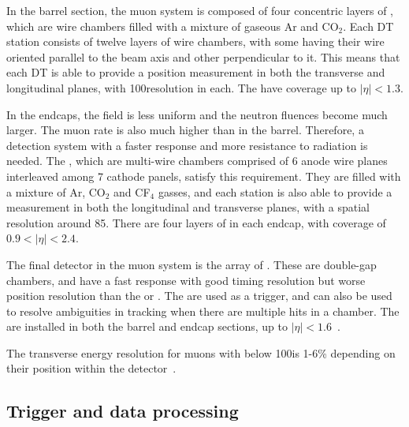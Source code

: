  In the barrel section, the muon system is composed of four concentric layers of \DTs, which are wire chambers filled with a mixture of gaseous Ar and CO$_{2}$. Each DT station consists of twelve layers of wire chambers, with some having their wire oriented parallel to the beam axis and other perpendicular to it. This means that each DT is able to provide a position measurement in both the transverse and longitudinal planes, with 100\um resolution in each. The \DTs have coverage up to $|\eta|<1.3$. 

In the endcaps, the field is less uniform and the neutron fluences become much larger. The muon rate is also much higher than in the barrel. Therefore, a detection system with a faster response and more resistance to radiation is needed. The \CSCs, which are multi-wire chambers comprised of 6 anode wire planes interleaved among 7 cathode panels, satisfy this requirement. They are filled with a mixture of Ar, CO$_{2}$ and CF$_{4}$ gasses, and each station is also able to provide a measurement in both the longitudinal and transverse planes, with a spatial resolution around 85\um. There are four layers of \CSCs in each endcap, with coverage of $0.9<|\eta|<2.4$.

The final detector in the muon system is the array of \RPCs. These are double-gap chambers, and have a fast response with good timing resolution but worse position resolution than the \DTs or \CSCs. The \RPCs are used as a trigger, and can also be used to resolve ambiguities in tracking when there are multiple hits in a chamber. The \RPCs are installed in both the barrel and endcap sections, up to $|\eta|<1.6$~\cite{CMSatLHC,cmsMuon}. 

The transverse energy resolution for muons with \pT below 100\GeV is 1-6\% depending on their position within the detector~\cite{MuonReco}.

\subsection{Trigger and data processing}
\label{sec:cms:trigger}

